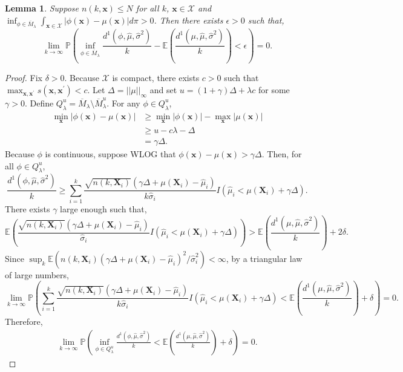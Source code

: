 \documentclass[12pt]{article}
\newcommand{\spa}[1]{\text{{$\mathcal{#1}$}}}
\newcommand{\vect}[1]{\ensuremath{\bm{#1}}}
\newcommand{\desCap}{\ensuremath{\bm{X}}}
\newtheorem{lemma}{Lemma}
\begin{document}
\begin{lemma}
\label{lemma: unboundedFiniteN}
    Suppose $n(k,\vect{x})\leq N$ for all $k$, $\vect{x} \in \spa{X}$ and $\inf_{\phi \in \overline{M}_\lambda} \int_{\vect{x} \in \spa{X}}|\phi(\vect{x})-\mu(\vect{x})|d\pi>0$. Then there exists $\epsilon>0$ such that,
    $$\lim_{k \to \infty}\mathbb{P}\left (\inf_{\phi \in \overline{M}_\lambda} \frac{d^1(\phi,\hat{\mu},\hat{\sigma}^2)}{k}-\mathbb{E}\left (\frac{d^1(\mu,\hat{\mu},\hat{\sigma}^2)}{k}\right )<\epsilon\right )=0.$$
\end{lemma}
\begin{proof}
    Fix $\delta>0$. Because $\spa{X}$ is compact, there exists $c>0$ such that $\max_{\vect{x},\vect{x}^\prime} s(\vect{x},\vect{x}^\prime)<c$. Let $\Delta=||\mu||_\infty$ and set $u=(1+\gamma)\Delta+\lambda c$ for some $\gamma>0$. Define $Q_\lambda^u=\overline{M}_\lambda \setminus \overline{M}_\lambda^u$. For any $\phi \in Q_\lambda^u$,
    \begin{equation*}
        \begin{split}
            \min_{\vect{x}}|\phi(\vect{x})-\mu(\vect{x})| & \geq \min_{\vect{x}} |\phi(\vect{x})|-\max_{\vect{x}} |\mu(\vect{x})|\\
            & \geq u-c\lambda - \Delta \\
            & = \gamma\Delta.
        \end{split}
    \end{equation*}
    Because $\phi$ is continuous, suppose WLOG that $\phi(\vect{x})-\mu(\vect{x})>\gamma\Delta$. Then, for all $\phi \in Q_\lambda^u$,
    $$\frac{d^1(\phi,\hat{\mu},\hat{\sigma}^2)}{k}\geq \sum_{i=1}^k \frac{\sqrt{n(k,\desCap_i)}(\gamma\Delta+\mu(\desCap_i)-\hat{\mu}_i)}{k\hat{\sigma}_i}I(\hat{\mu}_i<\mu(\desCap_i)+\gamma\Delta).$$
    There exists $\gamma$ large enough such that,
    $$\mathbb{E}\left ( \frac{\sqrt{n(k,\desCap_i)}(\gamma\Delta+\mu(\desCap_i)-\hat{\mu}_i)}{\hat{\sigma}_i}I(\hat{\mu}_i<\mu(\desCap_i)+\gamma\Delta) \right )>\mathbb{E}\left (\frac{d^1(\mu,\hat{\mu},\hat{\sigma}^2)}{k}\right )+2\delta.$$
    Since $\sup_{k} \mathbb{E}\left (n(k,\desCap_i)(\gamma\Delta+\mu(\desCap_i)-\hat{\mu}_i)^2/\hat{\sigma}^2_i \right )<\infty$, by a triangular law of large numbers,
    $$\lim_{k \to \infty} \mathbb{P} \left (\sum_{i=1}^k \frac{\sqrt{n(k,\desCap_i)}(\gamma\Delta+\mu(\desCap_i)-\hat{\mu}_i)}{k\hat{\sigma}_i}I(\hat{\mu}_i<\mu(\desCap_i)+\gamma\Delta)<\mathbb{E}\left (\frac{d^1(\mu,\hat{\mu},\hat{\sigma}^2)}{k}\right )+\delta\right )=0.$$
    Therefore,
    \begin{equation*}
        \begin{split}
            \lim_{k \to \infty} \mathbb{P} \left (\inf_{\phi \in Q_\lambda^u}\frac{d^1(\phi,\hat{\mu},\hat{\sigma}^2)}{k}<\mathbb{E}\left (\frac{d^1(\mu,\hat{\mu},\hat{\sigma}^2)}{k}\right )+\delta\right )=0.
        \end{split}
    \end{equation*}


\end{proof}
\end{document}
